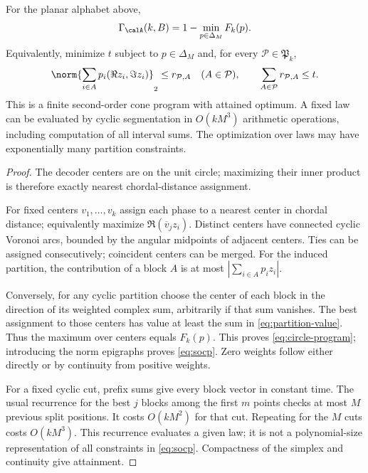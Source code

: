 \begin{theorem}\label{thm:circle-socp}
For the planar alphabet above,
\begin{equation}\label{eq:circle-program}
 \Gamma_{\calA}(k,B)=1-\min_{p\in\Delta_M}F_k(p).
\end{equation}
Equivalently, minimize $t$ subject to $p\in\Delta_M$ and, for every $\mathcal P\in\mathfrak P_k$,
\begin{equation}\label{eq:socp}
 \norm{\sum_{i\in A}p_i(\Re z_i,\Im z_i)}_2\le r_{\mathcal P,A}
 \quad(A\in\mathcal P),\qquad
 \sum_{A\in\mathcal P}r_{\mathcal P,A}\le t.
\end{equation}
This is a finite second-order cone program with attained optimum. A fixed law can be evaluated by cyclic segmentation in $O(kM^3)$ arithmetic operations, including computation of all interval sums. The optimization over laws may have exponentially many partition constraints.
\end{theorem}
\begin{proof}
The decoder centers are on the unit circle; maximizing their inner product is therefore exactly nearest chordal-distance assignment.

For fixed centers $v_1,\ldots,v_k$ assign each phase to a nearest center in chordal distance; equivalently maximize $\Re(\overline v_jz_i)$. Distinct centers have connected cyclic Voronoi arcs, bounded by the angular midpoints of adjacent centers. Ties can be assigned consecutively; coincident centers can be merged. For the induced partition, the contribution of a block $A$ is at most $|\sum_{i\in A}p_i z_i|$.

Conversely, for any cyclic partition choose the center of each block in the direction of its weighted complex sum, arbitrarily if that sum vanishes. The best assignment to those centers has value at least the sum in \eqref{eq:partition-value}. Thus the maximum over centers equals $F_k(p)$. This proves \eqref{eq:circle-program}; introducing the norm epigraphs proves \eqref{eq:socp}. Zero weights follow either directly or by continuity from positive weights.

For a fixed cyclic cut, prefix sums give every block vector in constant time. The usual recurrence for the best $j$ blocks among the first $m$ points checks at most $M$ previous split positions. It costs $O(kM^2)$ for that cut. Repeating for the $M$ cuts costs $O(kM^3)$. This recurrence evaluates a given law; it is not a polynomial-size representation of all constraints in \eqref{eq:socp}. Compactness of the simplex and continuity give attainment.
\end{proof}

